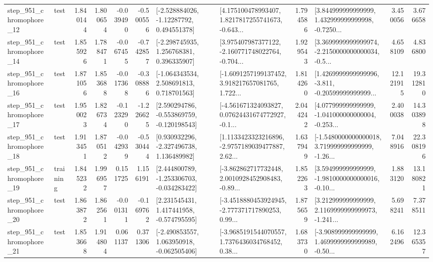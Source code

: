 \begin{tabular}{llrrrrllrlrr}
  step\_951\_chromophore\_12 &      test &      1.840144 &    1.800654 &     -0.039490 & -0.500556 &    [-2.528884026, -1.12287792, 0.494551378] &  [4.175100478993407, 1.8217817255741673, -0.643... &       1.794586 &  [3.844999999999999, 1.432999999999998, -0.7250... &            3.450056 &          3.676658 \\
  step\_951\_chromophore\_14 &      test &      1.855926 &    1.788471 &     -0.067455 & -0.742857 &    [-2.298745935, 1.256768381, 0.396335907] &  [3.975407987377122, -2.160771748022764, -0.704... &       1.929543 &  [3.3699999999999974, -2.2150000000000034, -0.5... &            4.658109 &          4.836800 \\
  step\_951\_chromophore\_16 &      test &      1.871056 &    1.853688 &     -0.017368 & -0.308886 &    [-1.064343534, 2.508691813, 0.718701563] &  [-1.6091257199137452, 3.918217657081765, 1.722... &       1.814260 &  [1.4269999999999996, -3.811, -0.20599999999999... &           12.121915 &         19.312810 \\
  step\_951\_chromophore\_17 &      test &      1.950023 &    1.826734 &     -0.123290 & -1.226625 &   [2.590294786, -0.553869759, -0.120198543] &  [-4.561671324093827, 0.07624431674772927, -0.1... &       2.044242 &  [4.077999999999999, -1.041000000000004, -0.253... &            2.400038 &         14.303898 \\
  step\_951\_chromophore\_18 &      test &      1.913451 &    1.870512 &     -0.042939 & -0.530444 &    [0.930932296, -2.327496738, 1.136489982] &  [1.1133423323216896, -2.9757189039477887, 2.62... &       1.637949 &  [-1.5480000000000018, 3.719999999999999, -1.26... &            7.048916 &         22.308196 \\
  step\_951\_chromophore\_19 &  training &      1.845232 &    1.996957 &      0.151725 &  1.156191 &   [2.444800789, -1.253306703, -0.034283422] &  [-3.862862717732448, 2.0010928452908483, -0.89... &       1.852263 &  [3.594999999999999, -1.9810000000000016, -0.10... &            1.883120 &         13.180821 \\
  step\_951\_chromophore\_20 &      test &      1.863872 &    1.862561 &     -0.001311 & -0.169762 &    [2.231545431, 1.417441958, -0.574795595] &  [-3.4518880453924945, -2.777371717890253, 0.99... &       1.875659 &  [3.212999999999999, 2.1169999999999973, -1.241... &            5.698241 &          7.378511 \\
  step\_951\_chromophore\_21 &      test &      1.853668 &    1.914804 &      0.061137 &  0.371306 &   [-2.490853557, 1.063950918, -0.062505406] &  [-3.9685191544070557, 1.7376436034768452, 0.38... &       1.683730 &  [-3.908999999999999, 1.4699999999999989, -0.50... &            6.162496 &         12.365357 \\

\end{tabular}

